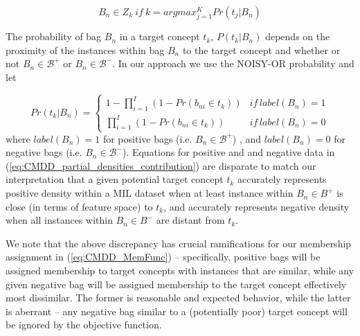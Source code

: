 \documentclass[12pt,dvips]{report}
\numberwithin{equation}{section}
\begin{document}
\begin{equation} \label{eq:CMDD_MemFunc}
B_{n} \in Z_{k} \: if \: k = argmax_{j=1}^{K}Pr(t_{j}\vert B_{n})
\end{equation} 

The probability of bag $B_{n}$ in a target concept $t_{k}$, $P(t_{k}\vert B_{n})$ depends on the proximity of the instances within bag $B_{n}$ to the target concept and whether or not $B_{n} \in \mathcal{B}^{+}$ or $B_{n} \in \mathcal{B}^{-}$.  In our approach we use the NOISY-OR probability \cite{srin93} and let

\begin{equation} \label{eq:CMDD_partial_densities_contribution}
Pr(t_{k}\vert B_{n})\!=\!\begin{cases}
1\!\!-\!\!\prod_{i=1}^{I}(1\!\!-\!\!Pr(b_{ni}\!\in \!\!t_{k})) & \!\!\!\!if\, label(B_{n})\!\!=\!\!1\\
\prod_{i=1}^{I}(1\!\!-\!\!Pr(b_{ni}\!\in \!\!t_{k})) &\!\! \!\!if\, label(B_{n})\!\!=\!\!0
\end{cases}
\end{equation} where $label(B_{n})=1$ for positive bags (i.e. $B_n \in \mathcal{B}^{+}$) , and $label(B_{n})=0$ for negative bags (i.e. $B_n \in \mathcal{B}^{-}$).  Equations for positive and and negative data in (\ref{eq:CMDD_partial_densities_contribution}) are disparate to match our interpretation that a given potential target concept $t_k$ accurately represents positive density within a MIL dataset when at least instance within $B_n \in B^{+}$ is close (in terms of feature space) to $t_k$, and accurately represents negative density when all instances within $B_n \in B^{-}$ are distant from $t_k$.  

We note that the above discrepancy has crucial ramifications for our membership assignment in (\ref{eq:CMDD_MemFunc}) -- specifically, positive bags will be assigned membership to target concepts with instances that are similar, while any given negative bag will be assigned membership to the target concept effectively most dissimilar.  The former is reasonable and expected behavior, while the latter is aberrant -- any negative bag similar to a (potentially poor) target concept will be ignored by the objective function.  
\end{document}
